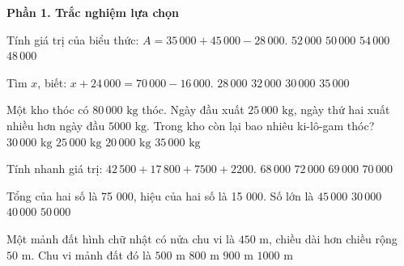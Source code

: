 \textbf{Phần 1. Trắc nghiệm lựa chọn}

\begin{ex} %
Tính giá trị của biểu thức: $A = 35\,000 + 45\,000 - 28\,000$.
\choice
{\True $52\,000$}
{$50\,000$}
{$54\,000$}
{$48\,000$}
\end{ex}

\begin{ex} %
Tìm $x$, biết: $x + 24\,000 = 70\,000 - 16\,000$.
\choice
{$28\,000$}
{$32\,000$}
{\True $30\,000$}
{$35\,000$}
\end{ex}

\begin{ex} %
Một kho thóc có $80\,000\text{ kg}$ thóc. Ngày đầu xuất $25\,000\text{ kg}$, ngày thứ hai xuất nhiều hơn ngày đầu $5000\text{ kg}$. Trong kho còn lại bao nhiêu ki-lô-gam thóc?
\choice
{$30\,000\text{ kg}$}
{\True $25\,000\text{ kg}$}
{$20\,000\text{ kg}$}
{$35\,000\text{ kg}$}
\end{ex}

\begin{ex} %
Tính nhanh giá trị: $42\,500 + 17\,800 + 7500 + 2200$.
\choice
{$68\,000$}
{$72\,000$}
{$69\,000$}
{\True $70\,000$}
\end{ex}

\begin{ex} %
Tổng của hai số là 75 000, hiệu của hai số là 15 000. Số lớn là
\choice
{\True $45\,000$}
{$30\,000$}
{$40\,000$}
{$50\,000$}
\end{ex}

\begin{ex} %
Một mảnh đất hình chữ nhật có nửa chu vi là $450\text{ m}$, chiều dài hơn chiều rộng $50\text{ m}$. Chu vi mảnh đất đó là
\choice
{$500\text{ m}$}
{$800\text{ m}$}
{\True $900\text{ m}$}
{$1000\text{ m}$}
\end{ex}

